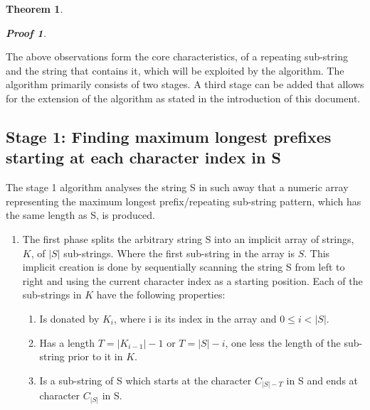\documentclass[12pt]{article}
\newtheorem{thm}{Theorem}[section]
\newtheorem{prf}{Proof}[section]
\begin{document}
\begin{flushleft}
\begin{thm}
\begin{prf}
\begin{enumerate}
			\end{enumerate}
		\end{prf} 
	\end{thm}
	
	The above observations form the core characteristics, of a repeating sub-string and the string that contains it, which will be exploited by the algorithm. The algorithm primarily consists of two stages. A third stage can be added that allows for the extension of the algorithm as stated in the introduction of this document.
	
	\subsection{Stage 1: Finding maximum longest prefixes starting at each character index in S}
		The stage 1 algorithm analyses the string S in such away that a numeric array representing the maximum longest prefix/repeating sub-string pattern, which has the same length as S, is produced. 
	
		\begin{enumerate}	
		\item The first phase splits the arbitrary string S into an implicit array of strings, $K$, of $|S|$ sub-strings. Where the first sub-string in the array is $S$. This implicit creation is done by sequentially scanning the string S from left to right and using the current character index as a starting position.    
		Each of the sub-strings in $K$ have the following properties:
			\begin{enumerate}
				\item Is donated by $K_{i}$, where i is its index in the array and $ 0 \le i < |S|$.
				\item Has a length $T = |K_{i-1}| - 1$ or $T = |S| - i$, one less the length of the sub-string prior to it in $K$.
				\item Is a sub-string of S which starts at the character $C_{|S| - T} $ in S and ends at character $C_{|S|}$ in S.
			\end{enumerate}		
		

\end{enumerate}
\end{flushleft}
\end{document}
